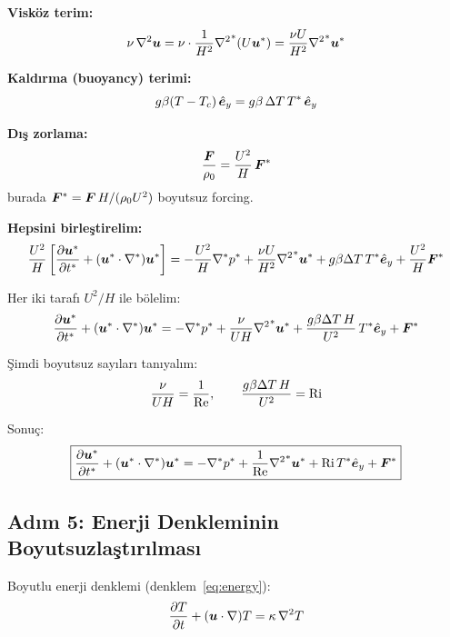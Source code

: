 \textbf{Visköz terim:}
\begin{equation}
    \nu\,\nabla^2\bm{u} = \nu \cdot \frac{1}{H^2}{\nabla^2}^*(U\bm{u}^*) = \frac{\nu U}{H^2}{\nabla^2}^*\bm{u}^*
\end{equation}

\textbf{Kaldırma (buoyancy) terimi:}
\begin{equation}
    g\beta(T-T_c)\,\hat{\bm{e}}_y = g\beta\,\Delta T\,T^*\,\hat{\bm{e}}_y
\end{equation}

\textbf{Dış zorlama:}
\begin{equation}
    \frac{\bm{F}}{\rho_0} = \frac{U^2}{H}\,\bm{F}^*
\end{equation}
burada $\bm{F}^* = \bm{F}\,H/(\rho_0 U^2)$ boyutsuz forcing.

\textbf{Hepsini birleştirelim:}
\begin{equation}
    \frac{U^2}{H}\left[\frac{\partial \bm{u}^*}{\partial t^*} + (\bm{u}^*\cdot\nabla^*)\bm{u}^*\right]
    = -\frac{U^2}{H}\nabla^* p^* + \frac{\nu U}{H^2}{\nabla^2}^*\bm{u}^* + g\beta\Delta T\,T^*\hat{\bm{e}}_y + \frac{U^2}{H}\bm{F}^*
\end{equation}

Her iki tarafı $U^2/H$ ile bölelim:
\begin{equation}
    \frac{\partial \bm{u}^*}{\partial t^*} + (\bm{u}^*\cdot\nabla^*)\bm{u}^* = -\nabla^* p^* + \frac{\nu}{UH}{\nabla^2}^*\bm{u}^* + \frac{g\beta\Delta T\,H}{U^2}\,T^*\hat{\bm{e}}_y + \bm{F}^*
\end{equation}

Şimdi boyutsuz sayıları tanıyalım:
\begin{equation}
    \frac{\nu}{UH} = \frac{1}{\mathrm{Re}}, \qquad \frac{g\beta\Delta T\,H}{U^2} = \mathrm{Ri}
\end{equation}

Sonuç:
\begin{equation}
    \boxed{\frac{\partial \bm{u}^*}{\partial t^*} + (\bm{u}^*\cdot\nabla^*)\bm{u}^* = -\nabla^* p^* + \frac{1}{\mathrm{Re}}{\nabla^2}^*\bm{u}^* + \mathrm{Ri}\,T^*\hat{\bm{e}}_y + \bm{F}^*}
    \label{eq:nondim_momentum}
\end{equation}

\subsection{Adım 5: Enerji Denkleminin Boyutsuzlaştırılması}

Boyutlu enerji denklemi (denklem~\ref{eq:energy}):
\begin{equation}
    \frac{\partial T}{\partial t} + (\bm{u}\cdot\nabla)T = \kappa\,\nabla^2 T
\end{equation}

